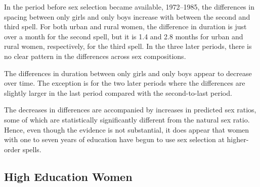 \documentclass[12pt,letterpaper]{article}
\begin{document}
In the period before sex selection became available, 1972--1985,
the differences in spacing between only girls and only boys
increase with between the second and third spell.
For both urban and rural women, the difference in duration is just over
a month for the second spell, but it is 1.4 and 2.8 months for urban and
rural women, respectively, for the third spell.
In the three later periods, there is no clear pattern
in the differences across sex compositions.

The differences in duration between only girls and only boys 
appear to decrease over time.
The exception is for the two later periods where the
differences are slightly larger in the last period compared
with the second-to-last period. 

The decreases in differences are accompanied by increases
in predicted sex ratios, some of which are statistically 
significantly different from the natural sex ratio.
Hence, even though the evidence is not substantial, it does
appear that women with one to seven years of education 
have begun to use sex selection at higher-order spells.

\subsection{High Education Women}



\end{document}
